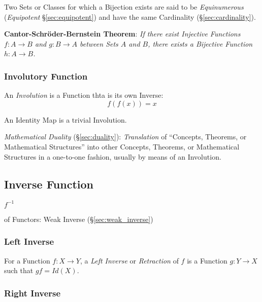 Two Sets or Classes for which a Bijection exists are said to be
\emph{Equinumerous} (\emph{Equipotent} \S\ref{sec:equipotent}) and have the same
Cardinality (\S\ref{sec:cardinality}).

\textbf{Cantor-Schr\"oder-Bernstein Theorem}: \emph{If there exist Injective
  Functions $f : A \rightarrow B$ and $g : B \rightarrow A$ between Sets $A$ and
  $B$, there exists a Bijective Function $h : A \rightarrow B$.}



\subsubsection{Involutory Function}\label{sec:involution}

An \emph{Involution} is a Function thta is its own Inverse:
\[
  f(f(x)) = x
\]

An Identity Map is a trivial Involution.

\fist \emph{Mathematical Duality} (\S\ref{sec:duality}): \emph{Translation} of
``Concepts, Theorems, or Mathematical Structures'' into other Concepts,
Theorems, or Mathematical Structures in a one-to-one fashion, usually by means
of an Involution.



\subsection{Inverse Function}\label{sec:inverse_function}

$f^{-1}$


of Functors: Weak Inverse (\S\ref{sec:weak_inverse})



\subsubsection{Left Inverse}\label{sec:left_inverse}

For a Function $f: X \rightarrow Y$, a \emph{Left Inverse} or
\emph{Retraction} of $f$ is a Function $g: Y \rightarrow X$ such that
$gf = Id(X)$.



\subsubsection{Right Inverse}\label{sec:right_inverse}

